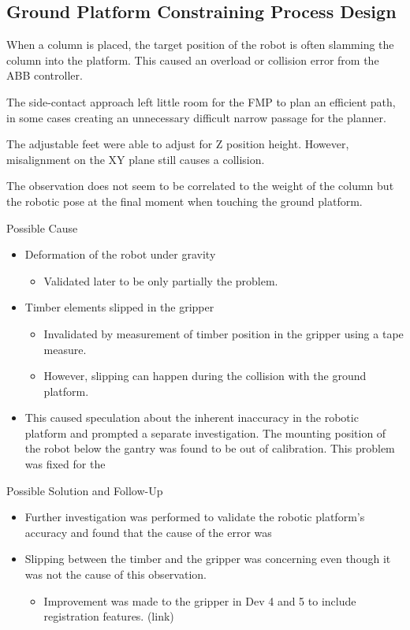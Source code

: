 \subsection{Ground Platform Constraining Process Design}
When a column is placed, the target position of the robot is often slamming the column into the platform. This caused an overload or collision error from the ABB controller.

The side-contact approach left little room for the FMP to plan an efficient path, in some cases creating an unnecessary difficult narrow passage for the planner.


The adjustable feet were able to adjust for Z position height. However, misalignment on the XY plane still causes a collision.

The observation does not seem to be correlated to the weight of the column but the robotic pose at the final moment when touching the ground platform.

Possible Cause
\begin{itemize}
    \item Deformation of the robot under gravity
    \begin{itemize}
        \item Validated later to be only partially the problem. 
    \end{itemize}
    \item Timber elements slipped in the gripper
    \begin{itemize}
        \item Invalidated by measurement of timber position in the gripper using a tape measure. 
        \item However, slipping can happen during the collision with the ground platform.
    \end{itemize}
    \item This caused speculation about the inherent inaccuracy in the robotic platform and prompted a separate investigation. The mounting position of the robot below the gantry was found to be out of calibration. This problem was fixed for the 
\end{itemize}

Possible Solution and Follow-Up
\begin{itemize}
    \item Further investigation was performed to validate the robotic platform’s accuracy and found that the cause of the error was 
    \item Slipping between the timber and the gripper was concerning even though it was not the cause of this observation. 
    \begin{itemize}
        \item Improvement was made to the gripper in Dev 4 and 5 to include registration features. (link)
    \end{itemize}
\end{itemize}


